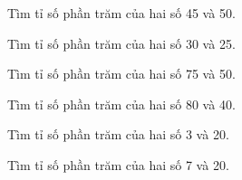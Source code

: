 \begin{ex}
  Tìm tỉ số phần trăm của hai số 45 và 50.
\end{ex}

\begin{ex}
  Tìm tỉ số phần trăm của hai số 30 và 25.
\end{ex}

\begin{ex}
  Tìm tỉ số phần trăm của hai số 75 và 50.
\end{ex}

\begin{ex}
  Tìm tỉ số phần trăm của hai số 80 và 40.
\end{ex}

\begin{ex}
  Tìm tỉ số phần trăm của hai số 3 và 20.
\end{ex}

\begin{ex}
  Tìm tỉ số phần trăm của hai số 7 và 20.
\end{ex}

